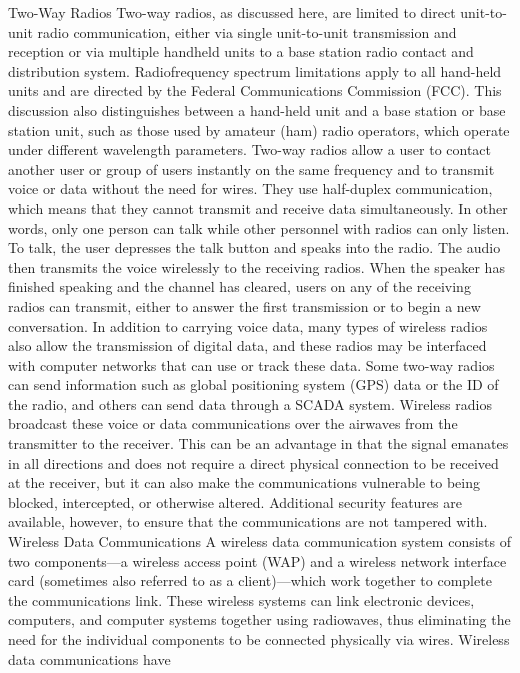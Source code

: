 \documentclass{article}
\begin{document}
Two-Way Radios Two-way radios, as discussed here, are limited to direct
unit-to-unit radio communication, either via single unit-to-unit
transmission and reception or via multiple handheld units to a base
station radio contact and distribution system. Radiofrequency spectrum
limitations apply to all hand-held units and are directed by the Federal
Communications Commission (FCC). This discussion also distinguishes
between a hand-held unit and a base station or base station unit, such
as those used by amateur (ham) radio operators, which operate under
different wavelength parameters. Two-way radios allow a user to contact
another user or group of users instantly on the same frequency and to
transmit voice or data without the need for wires. They use half-duplex
communication, which means that they cannot transmit and receive data
simultaneously. In other words, only one person can talk while other
personnel with radios can only listen. To talk, the user depresses the
talk button and speaks into the radio. The audio then transmits the
voice wirelessly to the receiving radios. When the speaker has finished
speaking and the channel has cleared, users on any of the receiving
radios can transmit, either to answer the first transmission or to begin
a new conversation. In addition to carrying voice data, many types of
wireless radios also allow the transmission of digital data, and these
radios may be interfaced with computer networks that can use or track
these data. Some two-way radios can send information such as global
positioning system (GPS) data or the ID of the radio, and others can
send data through a SCADA system. Wireless radios broadcast these voice
or data communications over the airwaves from the transmitter to the
receiver. This can be an advantage in that the signal emanates in all
directions and does not require a direct physical connection to be
received at the receiver, but it can also make the communications
vulnerable to being blocked, intercepted, or otherwise altered.
Additional security features are available, however, to ensure that the
communications are not tampered with. Wireless Data Communications A
wireless data communication system consists of two components---a
wireless access point (WAP) and a wireless network interface card
(sometimes also referred to as a client)---which work together to
complete the communications link. These wireless systems can link
electronic devices, computers, and computer systems together using
radiowaves, thus eliminating the need for the individual components to
be connected physically via wires. Wireless data communications have
\end{document}
